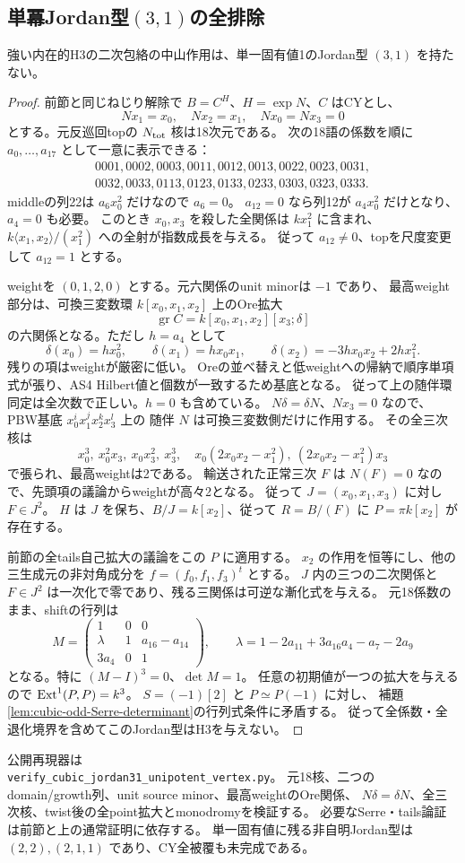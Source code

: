 \subsection{単冪Jordan型\texorpdfstring{$(3,1)$}{(3,1)}の全排除}
\label{subsec:cubic-jordan31-unipotent-vertex}
\begin{theorem}\label{thm:cubic-jordan31-unipotent-empty}
強い内在的H3の二次包絡の中山作用は、単一固有値1のJordan型 $(3,1)$ を持たない。
\end{theorem}
\begin{proof}
前節と同じねじり解除で $B=C^H$、$H=\exp N$、$C$ はCYとし、
\[
 Nx_1=x_0,\quad Nx_2=x_1,\quad Nx_0=Nx_3=0
\]
とする。元反巡回topの $N_{\rm tot}$ 核は18次元である。
次の18語の係数を順に $a_0,\ldots,a_{17}$ として一意に表示できる：
\[
\begin{gathered}
0001,0002,0003,0011,0012,0013,0022,0023,0031,\\
0032,0033,0113,0123,0133,0233,0303,0323,0333.
\end{gathered}
\]
middleの列22は $a_6x_0^2$ だけなので $a_6=0$。
$a_{12}=0$ なら列12が $a_4x_0^2$ だけとなり、$a_4=0$ も必要。
このとき $x_0,x_3$ を殺した全関係は $kx_1^2$ に含まれ、
$k\langle x_1,x_2\rangle/(x_1^2)$ への全射が指数成長を与える。
従って $a_{12}\ne0$、topを尺度変更して $a_{12}=1$ とする。

weightを $(0,1,2,0)$ とする。元六関係のunit minorは $-1$ であり、
最高weight部分は、可換三変数環 $k[x_0,x_1,x_2]$ 上のOre拡大
\[
 \operatorname{gr} C=k[x_0,x_1,x_2][x_3;\delta]
\]
の六関係となる。ただし $h=a_4$ として
\[
 \delta(x_0)=hx_0^2,\qquad \delta(x_1)=hx_0x_1,\qquad
 \delta(x_2)=-3hx_0x_2+2hx_1^2.
\]
残りの項はweightが厳密に低い。
Oreの並べ替えと低weightへの帰納で順序単項式が張り、AS4 Hilbert値と個数が一致するため基底となる。
従って上の随伴環同定は全次数で正しい。$h=0$ も含めている。
$N\delta=\delta N$、$Nx_3=0$ なので、PBW基底 $x_0^ix_1^jx_2^kx_3^l$ 上の
随伴 $N$ は可換三変数側だけに作用する。
その全三次核は
\[
 x_0^3,\ x_0^2x_3,\ x_0x_3^2,\ x_3^3,\quad
 x_0(2x_0x_2-x_1^2),\ (2x_0x_2-x_1^2)x_3
\]
で張られ、最高weightは2である。
輸送された正常三次 $F$ は $N(F)=0$ なので、先頭項の議論からweightが高々2となる。
従って $J=(x_0,x_1,x_3)$ に対し $F\in J^2$。
$H$ は $J$ を保ち、$B/J=k[x_2]$、従って $R=B/(F)$ に
$P=\pi k[x_2]$ が存在する。

前節の全tails自己拡大の議論をこの $P$ に適用する。
$x_2$ の作用を恒等にし、他の三生成元の非対角成分を
$f=(f_0,f_1,f_3)^t$ とする。
$J$ 内の三つの二次関係と $F\in J^2$ は一次化で零であり、残る三関係は可逆な漸化式を与える。
元18係数のまま、shiftの行列は
\[
 M=\begin{pmatrix}
 1&0&0\\
 \lambda&1&a_{16}-a_{14}\\
 3a_4&0&1
 \end{pmatrix},\qquad
 \lambda=1-2a_{11}+3a_{16}a_4-a_7-2a_9
\]
となる。特に $(M-I)^3=0$、$\det M=1$。
任意の初期値が一つの拡大を与えるので $\operatorname{Ext}^1(P,P)=k^3$。
$S=(-1)[2]$ と $P\simeq P(-1)$ に対し、
補題\ref{lem:cubic-odd-Serre-determinant}の行列式条件に矛盾する。
従って全係数・全退化境界を含めてこのJordan型はH3を与えない。
\end{proof}
公開再現器は\\
\texttt{verify\_cubic\_jordan31\_unipotent\_vertex.py}。
元18核、二つのdomain/growth列、unit source minor、最高weightのOre関係、
$N\delta=\delta N$、全三次核、twist後の全point拡大とmonodromyを検証する。
必要なSerre・tails論証は前節と上の通常証明に依存する。
単一固有値に残る非自明Jordan型は $(2,2),(2,1,1)$ であり、CY全被覆も未完成である。
